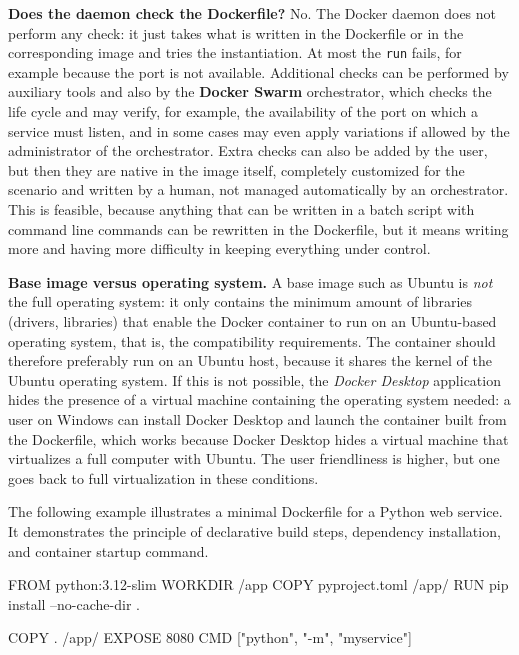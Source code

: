 \begin{notebox}
	\textbf{Does the daemon check the Dockerfile?} No. The Docker daemon does not perform any check: it just takes what is written in the Dockerfile or in the corresponding image and tries the instantiation. At most the \texttt{run} fails, for example because the port is not available. Additional checks can be performed by auxiliary tools and also by the \textbf{Docker Swarm} orchestrator, which checks the life cycle and may verify, for example, the availability of the port on which a service must listen, and in some cases may even apply variations if allowed by the administrator of the orchestrator. Extra checks can also be added by the user, but then they are native in the image itself, completely customized for the scenario and written by a human, not managed automatically by an orchestrator. This is feasible, because anything that can be written in a batch script with command line commands can be rewritten in the Dockerfile, but it means writing more and having more difficulty in keeping everything under control.
\end{notebox}

\begin{notebox}
	\textbf{Base image versus operating system.} A base image such as Ubuntu is \emph{not} the full operating system: it only contains the minimum amount of libraries (drivers, libraries) that enable the Docker container to run on an Ubuntu-based operating system, that is, the compatibility requirements. The container should therefore preferably run on an Ubuntu host, because it shares the kernel of the Ubuntu operating system. If this is not possible, the \emph{Docker Desktop} application hides the presence of a virtual machine containing the operating system needed: a user on Windows can install Docker Desktop and launch the container built from the Dockerfile, which works because Docker Desktop hides a virtual machine that virtualizes a full computer with Ubuntu. The user friendliness is higher, but one goes back to full virtualization in these conditions.
\end{notebox}

The following example illustrates a minimal Dockerfile for a Python web service. It demonstrates the principle of declarative build steps, dependency installation, and container startup command.

\begin{codeblock}
FROM python:3.12-slim
WORKDIR /app
COPY pyproject.toml /app/
RUN pip install --no-cache-dir .

COPY . /app/
EXPOSE 8080
CMD ["python", "-m", "myservice"]
\end{codeblock}

